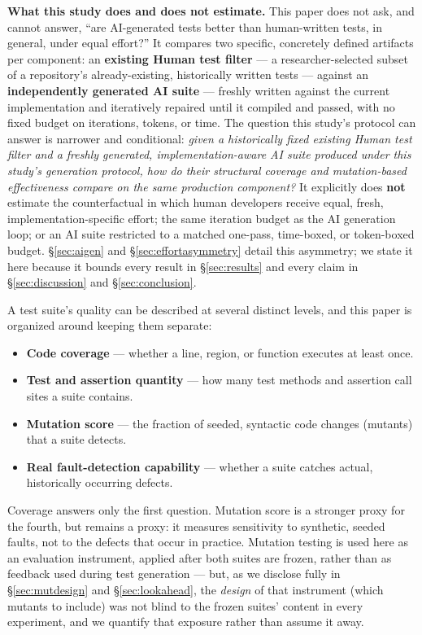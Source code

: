 \documentclass[10pt,conference]{IEEEtran}
\begin{document}
\textbf{What this study does and does not estimate.} This paper does not ask, and cannot answer, ``are AI-generated tests better than human-written tests, in general, under equal effort?'' It compares two specific, concretely defined artifacts per component: an \textbf{existing Human test filter} --- a researcher-selected subset of a repository's already-existing, historically written tests --- against an \textbf{independently generated AI suite} --- freshly written against the current implementation and iteratively repaired until it compiled and passed, with no fixed budget on iterations, tokens, or time. The question this study's protocol can answer is narrower and conditional: \emph{given a historically fixed existing Human test filter and a freshly generated, implementation-aware AI suite produced under this study's generation protocol, how do their structural coverage and mutation-based effectiveness compare on the same production component?} It explicitly does \textbf{not} estimate the counterfactual in which human developers receive equal, fresh, implementation-specific effort; the same iteration budget as the AI generation loop; or an AI suite restricted to a matched one-pass, time-boxed, or token-boxed budget. \S\ref{sec:aigen} and \S\ref{sec:effortasymmetry} detail this asymmetry; we state it here because it bounds every result in \S\ref{sec:results} and every claim in \S\ref{sec:discussion} and \S\ref{sec:conclusion}.

A test suite's quality can be described at several distinct levels, and this paper is organized around keeping them separate:
\begin{itemize}
\item \textbf{Code coverage} — whether a line, region, or function executes at least once.
\item \textbf{Test and assertion quantity} — how many test methods and assertion call sites a suite contains.
\item \textbf{Mutation score} — the fraction of seeded, syntactic code changes (mutants) that a suite detects.
\item \textbf{Real fault-detection capability} — whether a suite catches actual, historically occurring defects.
\end{itemize}
Coverage answers only the first question. Mutation score is a stronger proxy for the fourth, but remains a proxy: it measures sensitivity to synthetic, seeded faults, not to the defects that occur in practice. Mutation testing is used here as an evaluation instrument, applied after both suites are frozen, rather than as feedback used during test generation --- but, as we disclose fully in \S\ref{sec:mutdesign} and \S\ref{sec:lookahead}, the \emph{design} of that instrument (which mutants to include) was not blind to the frozen suites' content in every experiment, and we quantify that exposure rather than assume it away.
\end{document}
